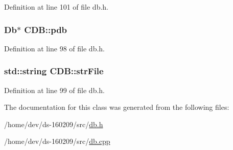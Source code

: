 Definition at line 101 of file db.\+h.

\hypertarget{class_c_d_b_a4520f55d31246fc06d80f72b5dd62253}{}
\subsubsection[{pdb}]{\setlength{\rightskip}{0pt plus 5cm}Db$\ast$ C\+D\+B\+::pdb\hspace{0.3cm}{\ttfamily [protected]}}\label{class_c_d_b_a4520f55d31246fc06d80f72b5dd62253}


Definition at line 98 of file db.\+h.

\hypertarget{class_c_d_b_a15c6112d9db9dcc5f11a2c05d9aa74a5}{}
\subsubsection[{str\+File}]{\setlength{\rightskip}{0pt plus 5cm}std\+::string C\+D\+B\+::str\+File\hspace{0.3cm}{\ttfamily [protected]}}\label{class_c_d_b_a15c6112d9db9dcc5f11a2c05d9aa74a5}


Definition at line 99 of file db.\+h.



The documentation for this class was generated from the following files\+:\begin{DoxyCompactItemize}
\item 
/home/dev/ds-\/160209/src/\hyperlink{db_8h}{db.\+h}\item 
/home/dev/ds-\/160209/src/\hyperlink{db_8cpp}{db.\+cpp}\end{DoxyCompactItemize}
